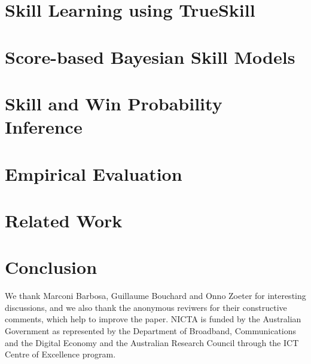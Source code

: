 \section{Skill Learning using TrueSkill}


\section{Score-based Bayesian Skill Models}


\section{Skill and Win Probability Inference}


\section{Empirical Evaluation}


\section{Related Work}


\section{Conclusion}


\begin{acknowledgements}
We thank Marconi Barbosa, Guillaume Bouchard and Onno Zoeter for interesting discussions, and we also thank the anonymous reviwers for their constructive comments, which help to improve the paper. NICTA is funded by the Australian Government as represented by the Department of Broadband, Communications and the Digital Economy and the Australian Research Council through the ICT Centre of Excellence program.
\end{acknowledgements}





